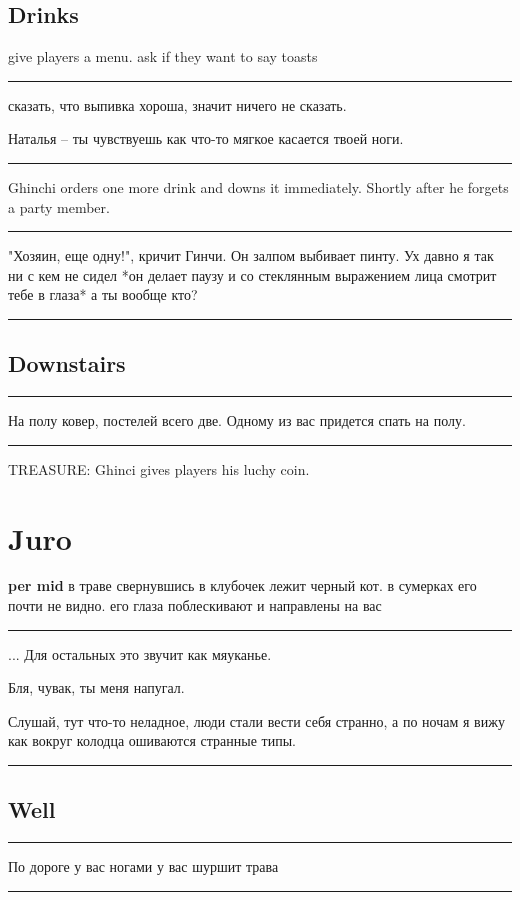 \documentclass[a5paper,11pt]{book}
\newenvironment{boxed}
{\em\noindent\rule[1ex]{\linewidth}{0.1pt}\linebreak\indent}
{\par\noindent\rule[1ex]{\linewidth}{0.1pt}}
\begin{document}
\begin{multicols}{2}
\subsection{Drinks}

give players a menu. ask if they want to say toasts

\begin{boxed}
сказать, что выпивка хороша, значит ничего не сказать.

Наталья -- ты чувствуешь как что-то мягкое касается твоей ноги.
\end{boxed}

Ghinchi orders one more drink and downs it immediately. Shortly after he forgets a  party member.

\begin{boxed}
"Хозяин, еще одну!", кричит Гинчи. Он залпом выбивает пинту. Ух давно я так ни с кем не сидел *он делает паузу и со стеклянным выражением лица смотрит тебе в глаза* а ты вообще кто?
\end{boxed}

\subsection{Downstairs}

\begin{boxed}
На полу ковер, постелей всего две. Одному из вас придется спать на полу.
\end{boxed}
 
TREASURE: Ghinci gives players his luchy coin.

\section{Juro}
\textbf{per mid} в траве свернувшись в клубочек лежит черный кот. в сумерках его почти не видно. его глаза поблескивают и направлены на вас

\begin{boxed}
  ... Для остальных это звучит как мяуканье. 

  Бля, чувак, ты меня напугал.

  Слушай, тут что-то неладное, люди стали вести себя странно, а по ночам я вижу как вокруг колодца ошиваются странные типы.
\end{boxed}

\subsection{Well}
\begin{boxed}
  По дороге у вас ногами у вас шуршит трава


\end{boxed}
\end{multicols}
\end{document}
